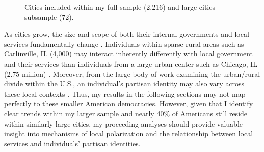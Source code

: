 \begin{figure}[H]
    \centering
    \caption[Included Cities Map]{Cities included within my full sample (2,216) and large cities subsample (72).}
    \label{fig:SampleMap}
\end{figure}
 

As cities grow, the size and scope of both their internal governments and local services fundamentally change \citep{oliverDemocracySuburbia2001,oliverLocalElectionsPolitics2012}. Individuals within sparse rural areas such as Carlinville, IL (4,000) may interact inherently differently with local government and their services than individuals from a large urban center such as Chicago, IL (2.75 million) \citep{mooreMotivationsMobilizationComparing2022,debenedictis-kessnerStrategicGovernmentCommunication2022,lassenJurisdictionSizeLocal2011}. Moreover, from the large body of work examining the urban/rural divide within the U.S., an individual's partisan identity may also vary across these local contexts \citep{gimpelUrbanruralDivideResidential2023,nemereverContentiousFederalismSheriffs2021,scalaPoliticalPolarizationRuralUrban2017}. Thus, my results in the following sections may not map perfectly to these smaller American democracies. However, given that I identify clear trends within my larger sample and nearly 40\% of Americans still reside within similarly large cities, my proceeding analyses should provide valuable insight into mechanisms of local polarization and the relationship between local services and individuals' partisan identities.

